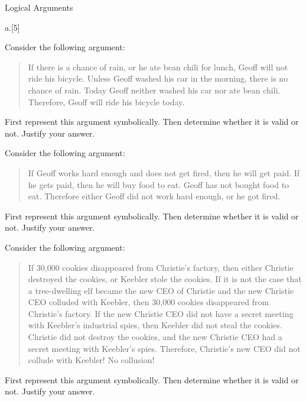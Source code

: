 \item[17] Logical Arguments
\begin{question}{a.}[5]

\item[4] Consider the following argument:
\begin{quote}
If there is a chance of rain, or he ate bean chili for lunch, Geoff will not ride his bicycle. Unless Geoff washed his car in the morning, there is no chance of rain. Today Geoff neither washed his car nor ate bean chili. Therefore, Geoff will ride his bicycle today.
\end{quote}

First represent this argument symbolically. Then determine whether it is valid or not.
Justify your answer.
\begin{Questions}
\vfill\eject
\end{Questions}

\item[4] Consider the following argument:
\begin{quote}
If Geoff works hard enough and does not get fired, then he will get paid. If he gets paid, then he will buy food to eat. Geoff has not bought food to eat. Therefore either Geoff did not work hard enough, or he got fired.
\end{quote}

First represent this argument symbolically. Then determine whether it is valid or not.
Justify your answer.
\begin{Questions}
\vfill\eject
\end{Questions}

\item [5]
Consider the following argument:
\begin{quote}
If 30,000 cookies disappeared from Christie's factory, then either Christie destroyed the cookies, or Keebler stole the cookies. If it is not the case that a tree-dwelling elf became the new CEO of Christie and the new Christie CEO colluded with Keebler, then 30,000 cookies disappeared from Christie's factory. If the new Christie CEO did not have a secret meeting with Keebler's industrial spies, then Keebler did not steal the cookies. Christie did not destroy the cookies, and the new Christie CEO had a secret meeting with Keebler's spies. Therefore, Christie's new CEO did not collude with Keebler! No collusion!
\end{quote}

First represent this argument symbolically. Then determine whether it is valid or not.
Justify your answer.
\begin{Questions}
\vfill\eject
\end{Questions}


\end{question}
